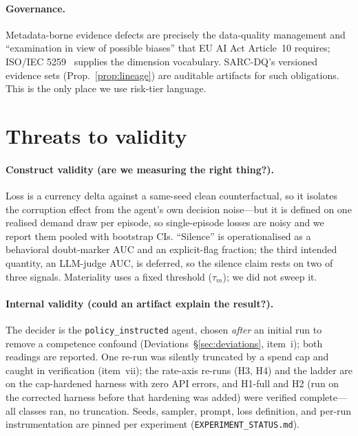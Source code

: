 \documentclass[11pt]{article}
\theoremstyle{plain}
\theoremstyle{definition}
\begin{document}
\paragraph{Governance.} Metadata-borne evidence defects are precisely the data-quality
management and ``examination in view of possible biases'' that EU AI Act Article~10
requires; ISO/IEC 5259~\cite{iso5259} supplies the dimension vocabulary. SARC-DQ's
versioned evidence sets (Prop.~\ref{prop:lineage}) are auditable artifacts for such
obligations. This is the only place we use risk-tier language.

\section{Threats to validity}\label{sec:threats}
\paragraph{Construct validity (are we measuring the right thing?).} Loss is a currency
delta against a same-seed clean counterfactual, so it isolates the corruption effect from
the agent's own decision noise---but it is defined on one realised demand draw per
episode, so single-episode losses are noisy and we report them pooled with bootstrap CIs.
``Silence'' is operationalised as a behavioral doubt-marker AUC and an explicit-flag
fraction; the third intended quantity, an LLM-judge AUC, is deferred, so the silence claim
rests on two of three signals. Materiality uses a fixed threshold ($\tau_m$); we did not
sweep it.
\paragraph{Internal validity (could an artifact explain the result?).} The decider is the
\texttt{policy\_instructed} agent, chosen \emph{after} an initial run to remove a
competence confound (Deviations~\S\ref{sec:deviations}, item~i); both readings are
reported. One re-run was silently truncated by a spend cap and caught in verification
(item~vii); the rate-axis re-runs (H3, H4) and the ladder are on the cap-hardened harness
with zero API errors, and H1-full and H2 (run on the corrected harness before that hardening
was added) were verified complete---all classes ran, no truncation. Seeds, sampler, prompt,
loss definition, and per-run instrumentation are pinned per experiment
(\texttt{EXPERIMENT\_STATUS.md}).
\end{document}
